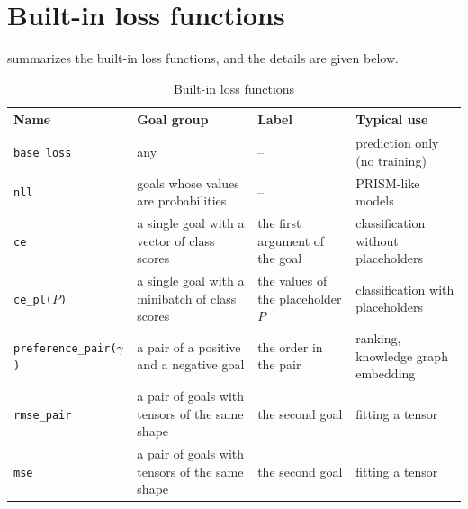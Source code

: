 \documentclass[a4paper]{report}
\begin{document}
\section{Built-in loss functions}
\label{sec:builtin_loss}

 summarizes the built-in loss functions, and the details are given below.
\begin{table}[tb]
	\centering
	\small
	\begin{tabular}{lP{4.4cm}P{3.0cm}P{3.4cm}}
		\toprule
		Name & Goal group & Label & Typical use \\
		\midrule
		{\tt base\_loss} & any & -- & prediction only (no training) \\
		{\tt nll} & goals whose values are probabilities & -- & PRISM-like models \\
		{\tt ce} & a single goal with a vector of class scores & the first argument of the goal & classification without placeholders \\
		{\tt ce\_pl($P$)} & a single goal with a minibatch of class scores & the values of the placeholder $P$ & classification with placeholders \\
		{\tt preference\_pair($\gamma$)} & a pair of a positive and a negative goal & the order in the pair & ranking, knowledge graph embedding \\
		{\tt rmse\_pair} & a pair of goals with tensors of the same shape & the second goal & fitting a tensor \\
		{\tt mse} & a pair of goals with tensors of the same shape & the second goal & fitting a tensor \\
		\bottomrule
	\end{tabular}
	\caption{Built-in loss functions}
	\label{tab:losses}
\end{table}
\end{document}
